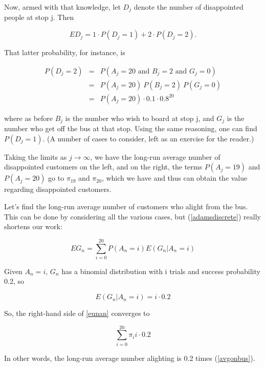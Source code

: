 Now, armed with that knowledge, let $D_j$ denote the number of
disappointed people at stop j.  Then

\begin{equation}
ED_j = 1 \cdot P(D_j = 1) + 2 \cdot P(D_j = 2).
\end{equation}

That latter probability, for instance, is

\begin{eqnarray}
P(D_j = 2) 
&=& 
P(A_j = 20 \textrm{ and } B_j = 2 \textrm{ and } G_j = 0) \\ 
&=& P(A_j = 20) ~ P(B_j = 2) ~ P(G_j = 0) \\
&=& P(A_j = 20) \cdot 0.1 \cdot 0.8^{20}
\end{eqnarray}

where as before $B_j$ is the number who wish to board at stop j, and
$G_j$ is the number who get off the bus at that stop.  Using the same
reasoning, one can find $P(D_j = 1)$. (A number of cases to consider,
left as an exercise for the reader.)

Taking the limits as $j \rightarrow \infty$, we have the long-run
average number of disappointed customers on the left, and on the right,
the terms $P(A_j = 19)$ and $P(A_j = 20)$ go to $\pi_{19}$ and
$\pi_{20}$, which we have and thus can obtain the value regarding
disappointed customers.

Let's find the long-run average number of customers who alight from the
bus.  This can be done by considering all the various cases, but
(\ref{adamsdiscrete}) really shortens our work:  

\begin{equation}
\label{eunan}
EG_n = \sum_{i=0}^{20} P(A_n = i) E(G_n | A_n = i)
\end{equation}

Given $A_n = i$, $G_n$ has a binomial distribution with i trials and
success probability 0.2, so 

\begin{equation}
E(G_n | A_n = i) = i \cdot 0.2
\end{equation}

So, the right-hand side of \ref{eunan} converges to

\begin{equation}
\sum_{i=0}^{20} \pi_i i \cdot 0.2
\end{equation}

In other words, the long-run average number alighting is 0.2 times
(\ref{avgonbus}).

